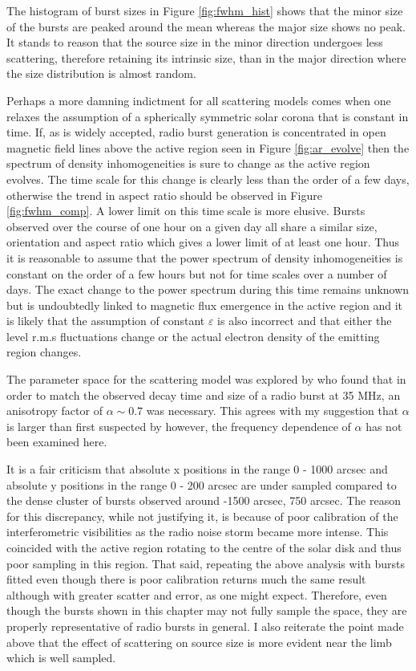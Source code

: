 The histogram of burst sizes in Figure \ref{fig:fwhm_hist} shows that the minor size of the bursts are peaked around the mean whereas the major size shows no peak. It stands to reason that the source size in the minor direction undergoes less scattering, therefore retaining its intrinsic size, than in the major direction where the size distribution is almost random.

Perhaps a more damning indictment for all scattering models comes when one relaxes the assumption of a spherically symmetric solar corona that is constant in time.  If, as is widely accepted, radio burst generation is concentrated in open magnetic field lines above the active region seen in Figure \ref{fig:ar_evolve} then the spectrum of density inhomogeneities is sure to change as the active region evolves. The time scale for this change is clearly less than the order of a few days, otherwise the trend in aspect ratio should be observed in Figure \ref{fig:fwhm_comp}. A lower limit on this time scale is more elusive. Bursts observed over the course of one hour on a given day all share a similar size, orientation and aspect ratio which gives a lower limit of at least one hour. Thus it is reasonable to assume that the power spectrum of density inhomogeneities is constant on the order of a few hours but not for time scales over a number of days. The exact change to the power spectrum during this time remains unknown but is undoubtedly linked to magnetic flux emergence in the active region and it is likely that the assumption of constant $\varepsilon$ is also incorrect and that either the level r.m.s fluctuations change or the actual electron density of the emitting region changes.

The parameter space for the scattering model was explored by \cite{Zhang2021} who found that in order to match the observed decay time and size of a radio burst at 35 MHz, an anisotropy factor of $\alpha \sim 0.7$ was necessary. This agrees with my suggestion that $\alpha$ is larger than first suspected by \cite{Kontar2019} however, the frequency dependence of $\alpha$ has not been examined here.

It is a fair criticism that absolute x positions in the range 0 - 1000 arcsec and absolute y positions in the range 0 - 200 arcsec are under sampled compared to the dense cluster of bursts observed around -1500 arcsec, 750 arcsec. The reason for this discrepancy, while not justifying it, is because of poor calibration of the interferometric visibilities as the radio noise storm became more intense. This coincided with the active region rotating to the centre of the solar disk and thus poor sampling in this region. That said, repeating the above analysis with bursts fitted even though there is poor calibration returns much the same result although with greater scatter and error, as one might expect. Therefore, even though the bursts shown in this chapter may not fully sample the space, they are properly representative of radio bursts in general. I also reiterate the point made above that the effect of scattering on source size is more evident near the limb which is well sampled. 

